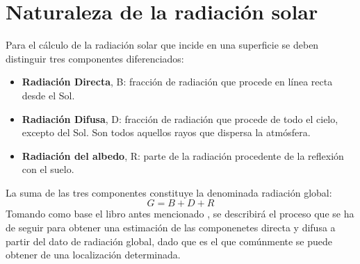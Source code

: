 \section{Naturaleza de la radiación solar}
\label{sec:org1bb7e59}
\label{sec:naturaleza-radiacion-solar}
Para el cálculo de la radiación solar que incide en una superficie se deben distinguir tres componentes diferenciados:
\begin{itemize}
\item \textbf{Radiación Directa}, B: fracción de radiación que procede en línea recta desde el Sol.
\item \textbf{Radiación Difusa}, D: fracción de radiación que procede de todo el cielo, excepto del Sol. Son todos aquellos rayos que dispersa la atmósfera.
\item \textbf{Radiación del albedo}, R: parte de la radiación procedente de la reflexión con el suelo.
\end{itemize}
La suma de las tres componentes constituye la denominada radiación global: 
\begin{equation}
G = B + D + R
\label{eq:comp_rad}
\end{equation}
Tomando como base el libro antes mencionado \cite{Perpinan2023}, se describirá el proceso que se ha de seguir para obtener una estimación de las componenetes directa y difusa a partir del dato de radiación global, dado que es el que comúnmente se puede obtener de una localización determinada.

